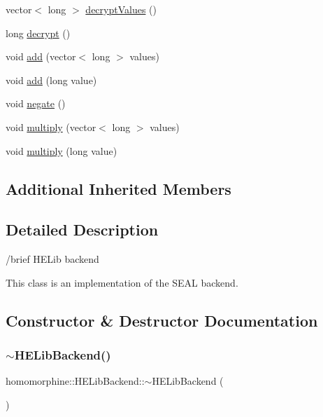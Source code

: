 \begin{DoxyCompactItemize}
\item 
vector$<$ long $>$ \mbox{\hyperlink{classhomomorphine_1_1_h_e_lib_backend_a650d87bee6056a404f8ab81ec0f84980}{decrypt\+Values}} ()
\item 
long \mbox{\hyperlink{classhomomorphine_1_1_h_e_lib_backend_a2cd3ebc5a3332100e6cb24480262c395}{decrypt}} ()
\item 
void \mbox{\hyperlink{classhomomorphine_1_1_h_e_lib_backend_a1e3c4745d7efdaac1f75c5a7fbfc3707}{add}} (vector$<$ long $>$ values)
\item 
void \mbox{\hyperlink{classhomomorphine_1_1_h_e_lib_backend_a6cc00dcfc209206e67c7237934cb8d82}{add}} (long value)
\item 
void \mbox{\hyperlink{classhomomorphine_1_1_h_e_lib_backend_acb1ed456fa91fc1dfe878abb068f3f34}{negate}} ()
\item 
void \mbox{\hyperlink{classhomomorphine_1_1_h_e_lib_backend_a05b508bcc4a165d045ebc09f190c5a95}{multiply}} (vector$<$ long $>$ values)
\item 
void \mbox{\hyperlink{classhomomorphine_1_1_h_e_lib_backend_a49d4e073eecc4759f12f60188a533835}{multiply}} (long value)
\end{DoxyCompactItemize}
\subsection*{Additional Inherited Members}


\subsection{Detailed Description}
/brief H\+E\+Lib backend

This class is an implementation of the S\+E\+AL backend. 

\subsection{Constructor \& Destructor Documentation}
\mbox{\label{classhomomorphine_1_1_h_e_lib_backend_a1ef98efe05281fefbe6d044dc474017a}} 
\subsubsection{\texorpdfstring{$\sim$HELibBackend()}{~HELibBackend()}}
{\footnotesize\ttfamily homomorphine\+::\+H\+E\+Lib\+Backend\+::$\sim$\+H\+E\+Lib\+Backend (\begin{DoxyParamCaption}{ }\end{DoxyParamCaption})}

